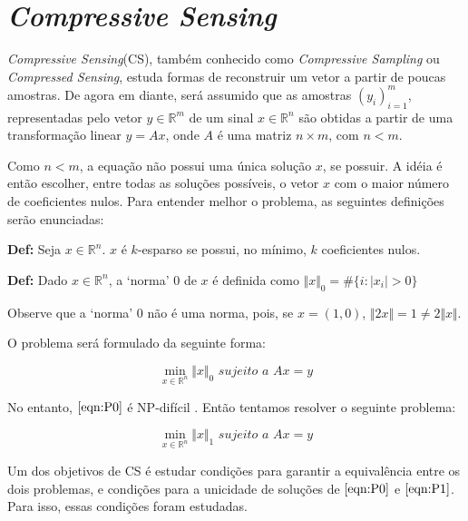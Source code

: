 \chapter{\textit{Compressive Sensing}}

\textit{Compressive Sensing}(CS), também conhecido como \textit{Compressive Sampling} ou \textit{Compressed Sensing},  estuda formas de reconstruir um vetor a partir de poucas amostras. De agora em diante, será assumido que as amostras $(y_i)_{i = 1}^m$, representadas pelo vetor $y \in \mathbb{R}^m$ de um sinal $x \in \mathbb{R}^n$ são obtidas a partir de uma transformação linear $y = Ax$, onde $A$ é uma matriz $n \times m$, com $n < m$.

Como $n < m$, a equação não possui uma única solução $x$, se possuir. A idéia é então escolher, entre todas as soluções possíveis, o vetor $x$ com o maior número de coeficientes nulos. Para entender melhor o problema, as seguintes definições serão enunciadas:

\textbf{Def:} Seja $x \in \mathbb{R}^n$. $x$ é $k$-esparso se possui, no mínimo, $k$ coeficientes nulos.

\textbf{Def:} Dado $x \in \mathbb{R}^n$, a `norma' $0$ de $x$ é definida como
$\Vert x \Vert_{0} = \# \lbrace i : \vert x_i \vert > 0 \rbrace$ 

Observe que a `norma' 0 não é uma norma, pois, se $x = (1, 0)$, $\Vert 2x \Vert = 1 \neq 2 \Vert x \Vert$.

O problema será formulado da seguinte forma:

\begin{equation}
\tag{$P_0$}
\min_{x \in \mathbb{R}^n} \Vert x \Vert_{0} \textit{ sujeito a } Ax = y
\label{eqn:P0}
\end{equation}

No entanto, $\eqref{eqn:P0}$ é NP-difícil \cite{fourau}. Então tentamos resolver o seguinte problema:

\begin{equation}
\tag{$P_1$}
\min_{x \in \mathbb{R}^n} \Vert x \Vert_{1} \textit{ sujeito a } Ax = y
\label{eqn:P1}
\end{equation}

Um dos objetivos de CS é estudar condições para garantir a equivalência entre os dois problemas, e condições para a unicidade de soluções de $\eqref{eqn:P0}$ e $\eqref{eqn:P1}$. Para isso, essas condições foram estudadas.%


